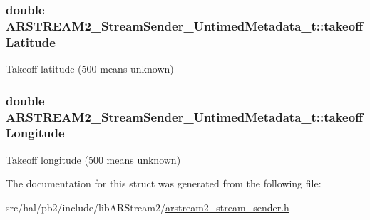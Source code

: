 \subsubsection[{\texorpdfstring{takeoff\+Latitude}{takeoffLatitude}}]{\setlength{\rightskip}{0pt plus 5cm}double A\+R\+S\+T\+R\+E\+A\+M2\+\_\+\+Stream\+Sender\+\_\+\+Untimed\+Metadata\+\_\+t\+::takeoff\+Latitude}\hypertarget{struct_a_r_s_t_r_e_a_m2___stream_sender___untimed_metadata__t_a88522bc343d9ccb7b6279dcd87f23bc7}{}\label{struct_a_r_s_t_r_e_a_m2___stream_sender___untimed_metadata__t_a88522bc343d9ccb7b6279dcd87f23bc7}
Takeoff latitude (500 means unknown) 
\subsubsection[{\texorpdfstring{takeoff\+Longitude}{takeoffLongitude}}]{\setlength{\rightskip}{0pt plus 5cm}double A\+R\+S\+T\+R\+E\+A\+M2\+\_\+\+Stream\+Sender\+\_\+\+Untimed\+Metadata\+\_\+t\+::takeoff\+Longitude}\hypertarget{struct_a_r_s_t_r_e_a_m2___stream_sender___untimed_metadata__t_a92622087dc7bd77278590ef76be4b6b9}{}\label{struct_a_r_s_t_r_e_a_m2___stream_sender___untimed_metadata__t_a92622087dc7bd77278590ef76be4b6b9}
Takeoff longitude (500 means unknown) 

The documentation for this struct was generated from the following file\+:\begin{DoxyCompactItemize}
\item 
src/hal/pb2/include/lib\+A\+R\+Stream2/\hyperlink{arstream2__stream__sender_8h}{arstream2\+\_\+stream\+\_\+sender.\+h}\end{DoxyCompactItemize}
